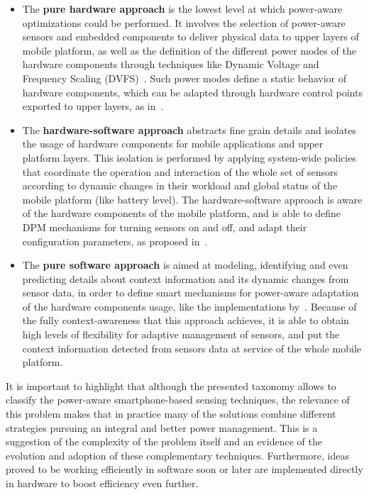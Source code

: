 \documentclass[12pt]{article}
\numberwithin{equation}{section}
\numberwithin{table}{section}
\numberwithin{figure}{section}
\begin{document}
\begin{itemize}
  \item The \textbf{pure hardware approach} is the lowest level at which power-aware optimizations could be performed.
  It involves the selection of power-aware sensors and embedded components to deliver physical data to upper layers of mobile platform, as well as the definition of the different power modes of the hardware components through techniques like Dynamic Voltage and Frequency Scaling (DVFS)~\cite{Priyantha2011,Choi2010}.
  Such power modes define a static behavior of hardware components, which can be adapted through hardware control points exported to upper layers, as in~\cite{Priyantha2011,Choudhury2008,Apple2015}.
  \item The \textbf{hardware-software approach} abstracts fine grain details and isolates the usage of hardware components for mobile applications and upper platform layers.
  This isolation is performed by applying system-wide policies that coordinate the operation and interaction of the whole set of sensors according to dynamic changes in their workload and global status of the mobile platform (like battery level).
  The hardware-software approach is aware of the hardware components of the mobile platform, and is able to define DPM mechanisms for turning sensors on and off, and adapt their configuration parameters, as proposed in~\cite{Ra2012,Zhuang2010}.
  \item The \textbf{pure software approach} is aimed at modeling, identifying and even predicting details about context information and its dynamic changes from sensor data, in order to define smart mechanisms for power-aware adaptation of the hardware components usage, like the implementations by~\cite{Chon2014,Yurur2014,MaY2009}.
  Because of the fully context-awareness that this approach achieves, it is able to obtain high levels of flexibility for adaptive management of sensors, and put the context information detected from sensors data at service of the whole mobile platform.
\end{itemize}



It is important to highlight that although the presented taxonomy allows to classify the power-aware smartphone-based sensing techniques, the relevance of this problem makes that in practice many of the solutions combine different strategies pursuing an integral and better power management.
This is a suggestion of the complexity of the problem itself and an evidence of the evolution and adoption of these complementary techniques.
Furthermore, ideas proved to be working efficiently in software soon or later are implemented directly in hardware to boost efficiency even further. 
\end{document}
